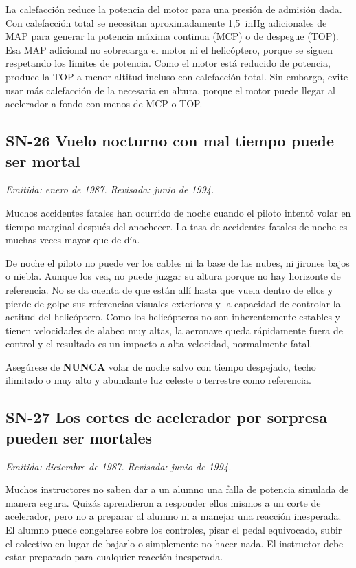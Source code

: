 La calefacción reduce la potencia del motor para una presión de admisión dada. Con calefacción total se necesitan aproximadamente 1,5~inHg adicionales de MAP para generar la potencia máxima continua (MCP) o de despegue (TOP). Esa MAP adicional no sobrecarga el motor ni el helicóptero, porque se siguen respetando los límites de potencia. Como el motor está reducido de potencia, produce la TOP a menor altitud incluso con calefacción total. Sin embargo, evite usar más calefacción de la necesaria en altura, porque el motor puede llegar al acelerador a fondo con menos de MCP o TOP.

\subsection*{SN-26 \quad Vuelo nocturno con mal tiempo puede ser mortal}
{\small\textit{Emitida: enero de 1987. Revisada: junio de 1994.}}

Muchos accidentes fatales han ocurrido de noche cuando el piloto intentó volar en tiempo marginal después del anochecer. La tasa de accidentes fatales de noche es muchas veces mayor que de día.

De noche el piloto no puede ver los cables ni la base de las nubes, ni jirones bajos o niebla. Aunque los vea, no puede juzgar su altura porque no hay horizonte de referencia. No se da cuenta de que están allí hasta que vuela dentro de ellos y pierde de golpe sus referencias visuales exteriores y la capacidad de controlar la actitud del helicóptero. Como los helicópteros no son inherentemente estables y tienen velocidades de alabeo muy altas, la aeronave queda rápidamente fuera de control y el resultado es un impacto a alta velocidad, normalmente fatal.

Asegúrese de \textbf{NUNCA} volar de noche salvo con tiempo despejado, techo ilimitado o muy alto y abundante luz celeste o terrestre como referencia.

\subsection*{SN-27 \quad Los cortes de acelerador por sorpresa pueden ser mortales}
{\small\textit{Emitida: diciembre de 1987. Revisada: junio de 1994.}}

Muchos instructores no saben dar a un alumno una falla de potencia simulada de manera segura. Quizás aprendieron a responder ellos mismos a un corte de acelerador, pero no a preparar al alumno ni a manejar una reacción inesperada. El alumno puede congelarse sobre los controles, pisar el pedal equivocado, subir el colectivo en lugar de bajarlo o simplemente no hacer nada. El instructor debe estar preparado para cualquier reacción inesperada.

